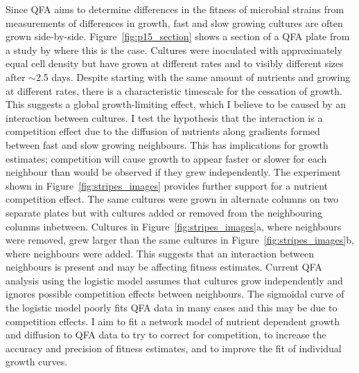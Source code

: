 Since QFA aims to determine differences in the fitness of microbial
strains from measurements of differences in growth, fast and slow
growing cultures are often grown
side-by-side. Figure~\ref{fig:p15_section} shows a section of a QFA
plate from a study by \citet{Addinall2011} where this is the
case. Cultures were inoculated with approximately equal cell density
but have grown at different rates and to visibly different sizes after
\(\sim\)2.5 days. Despite starting with the same amount of nutrients
and growing at different rates, there is a characteristic timescale
for the cessation of growth. This suggests a global growth-limiting
effect, which I believe to be caused by an interaction between
cultures. I test the hypothesis that the interaction is a competition
effect due to the diffusion of nutrients along gradients formed
between fast and slow growing neighbours. This has implications for
growth estimates; competition will cause growth to appear faster or
slower for each neighbour than would be observed if they grew
independently. The experiment shown in Figure~\ref{fig:stripes_images}
provides further support for a nutrient competition effect. The same
cultures were grown in alternate columns on two separate plates but
with cultures added or removed from the neighbouring columns
inbetween. Cultures in Figure~\ref{fig:stripes_images}a, where
neighbours were removed, grew larger
than the same cultures in Figure~\ref{fig:stripes_images}b, where
neighbours were added. This suggests that an interaction between
neighbours is present and may be affecting fitness estimates. Current
QFA analysis using the logistic model assumes that cultures grow
independently and ignores possible competition effects between
neighbours. The sigmoidal curve of the logistic model poorly fits QFA
data in many cases
and this may be due to competition effects. I aim to fit a network
model of nutrient dependent growth and diffusion to QFA data to try to
correct for competition, to increase the accuracy and precision of
fitness estimates, and to improve the fit of individual growth curves.

